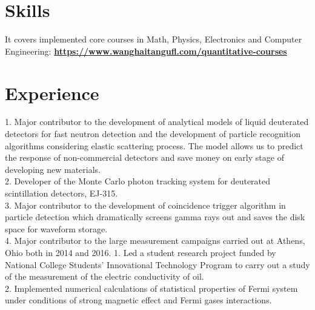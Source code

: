 \documentclass[11pt,a4paper,sans]{moderncv}
\begin{document}
\section{Skills}
 {It covers implemented core courses in Math, Physics, Electronics and Computer Engineering: \textbf{\textcolor{black}{\url{https://www.wanghaitangufl.com/quantitative-courses}}}} 
\section{Experience}
{}
{
1. Major contributor to the development of analytical models of liquid deuterated detectors for fast neutron detection and the development of particle recognition algorithms considering elastic scattering process. The model allows us to predict the response of non-commercial detectors and save money on early stage of developing new materials.\\
2. Developer of the Monte Carlo photon tracking system for deuterated scintillation detectors, EJ-315.\\
3. Major contributor to the development of coincidence trigger algorithm in particle detection which dramatically screens gamma rays out and saves the disk space for waveform storage.   \\
4. Major contributor to the large measurement campaigns carried out at Athens, Ohio both in 2014 and 2016. 
}
{1. Led a student research project funded by National College Students' Innovational Technology Program to carry out a study of the measurement of the electric conductivity of oil. \\
2. Implemented numerical calculations of statistical properties of Fermi system under conditions of strong magnetic effect and Fermi gases interactions.}
\end{document}

